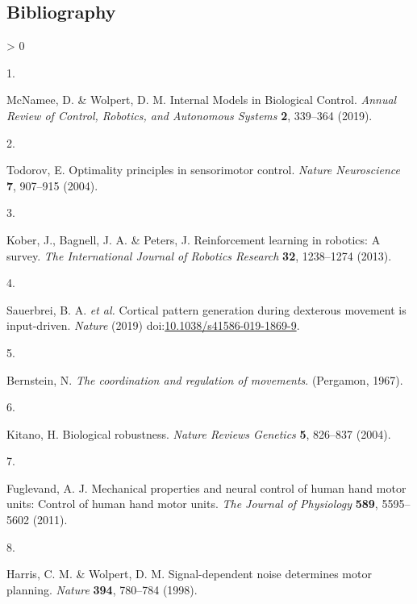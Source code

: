 \documentclass[
  a4paper,
]{article}
\newlength{\cslhangindent}
\newlength{\csllabelwidth}
\newenvironment{CSLReferences}[2] %
 {%
  \setlength{\parindent}{0pt}
  \ifodd #1 \everypar{\setlength{\hangindent}{\cslhangindent}}\ignorespaces\fi
  \ifnum #2 > 0
  \setlength{\parskip}{#2\baselineskip}
  \fi
 }%
 {}
\newcommand{\CSLLeftMargin}[1]{\parbox[t]{\csllabelwidth}{#1}}
\newcommand{\CSLRightInline}[1]{\parbox[t]{\linewidth - \csllabelwidth}{#1}\break}
\begin{document}
\newpage

\hypertarget{bibliography}{%
\subsection*{Bibliography}\label{bibliography}}

\hypertarget{refs}{}
\begin{CSLReferences}{0}{0}
\leavevmode\hypertarget{ref-McNamee2019}{}%
\CSLLeftMargin{1. }
\CSLRightInline{McNamee, D. \& Wolpert, D. M. Internal {Models} in
{Biological Control}. \emph{Annual Review of Control, Robotics, and
Autonomous Systems} \textbf{2}, 339--364 (2019).}

\leavevmode\hypertarget{ref-Todorov2004}{}%
\CSLLeftMargin{2. }
\CSLRightInline{Todorov, E. Optimality principles in sensorimotor
control. \emph{Nature Neuroscience} \textbf{7}, 907--915 (2004).}

\leavevmode\hypertarget{ref-koberReinforcementLearningRobotics2013}{}%
\CSLLeftMargin{3. }
\CSLRightInline{Kober, J., Bagnell, J. A. \& Peters, J. Reinforcement
learning in robotics: {A} survey. \emph{The International Journal of
Robotics Research} \textbf{32}, 1238--1274 (2013).}

\leavevmode\hypertarget{ref-sauerbreiCorticalPatternGeneration2019}{}%
\CSLLeftMargin{4. }
\CSLRightInline{Sauerbrei, B. A. \emph{et al.} Cortical pattern
generation during dexterous movement is input-driven. \emph{Nature}
(2019)
doi:\href{https://doi.org/10.1038/s41586-019-1869-9}{10.1038/s41586-019-1869-9}.}

\leavevmode\hypertarget{ref-Bernstein1967}{}%
\CSLLeftMargin{5. }
\CSLRightInline{Bernstein, N. \emph{The coordination and regulation of
movements}. ({Pergamon}, 1967).}

\leavevmode\hypertarget{ref-kitanoBiologicalRobustness2004}{}%
\CSLLeftMargin{6. }
\CSLRightInline{Kitano, H. Biological robustness. \emph{Nature Reviews
Genetics} \textbf{5}, 826--837 (2004).}

\leavevmode\hypertarget{ref-fuglevandMechanicalPropertiesNeural2011}{}%
\CSLLeftMargin{7. }
\CSLRightInline{Fuglevand, A. J. Mechanical properties and neural
control of human hand motor units: {Control} of human hand motor units.
\emph{The Journal of Physiology} \textbf{589}, 5595--5602 (2011).}

\leavevmode\hypertarget{ref-harrisSignaldependentNoiseDetermines1998}{}%
\CSLLeftMargin{8. }
\CSLRightInline{Harris, C. M. \& Wolpert, D. M. Signal-dependent noise
determines motor planning. \emph{Nature} \textbf{394}, 780--784 (1998).}


\end{CSLReferences}
\end{document}
